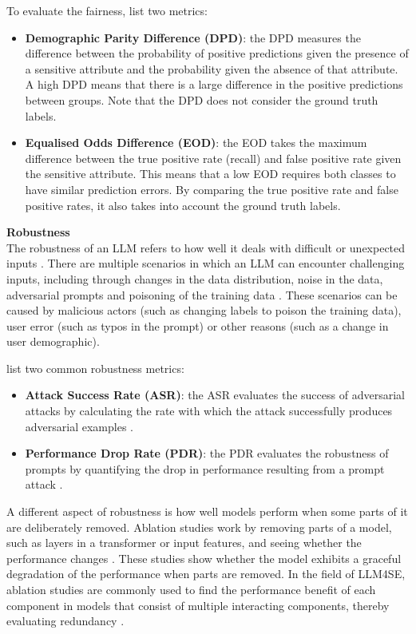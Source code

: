 \documentclass[a4paper]{article}
\begin{document}
To evaluate the fairness, \textcite{wang2024decodingtrust} list two metrics:
\begin{itemize}
	\item \textbf{Demographic Parity Difference (DPD)}: the DPD measures the difference between the probability of positive predictions given the presence of a sensitive attribute and the probability given the absence of that attribute. A high DPD means that there is a large difference in the positive predictions between groups. Note that the DPD does not consider the ground truth labels.
	\item \textbf{Equalised Odds Difference (EOD)}: the EOD takes the maximum difference between the true positive rate (recall) and false positive rate given the sensitive attribute. This means that a low EOD requires both classes to have similar prediction errors. By comparing the true positive rate and false positive rates, it also takes into account the ground truth labels. 
\end{itemize}

\textbf{Robustness}\\
The robustness of an LLM refers to how well it deals with difficult or unexpected inputs \cite{chang2023}. There are multiple scenarios in which an LLM can encounter challenging inputs, including through changes in the data distribution, noise in the data, adversarial prompts and poisoning of the training data \cite{liu2024,chang2023}. These scenarios can be caused by malicious actors (such as changing labels to poison the training data), user error (such as typos in the prompt) or other reasons (such as a change in user demographic). 

\textcite{chang2023} list two common robustness metrics:
\begin{itemize}
	\item \textbf{Attack Success Rate (ASR)}: the ASR evaluates the success of adversarial attacks by calculating the rate with which the attack successfully produces adversarial examples \cite{liu2024attacksuccesrate}. 
	\item \textbf{Performance Drop Rate (PDR)}: the PDR evaluates the robustness of prompts by quantifying the drop in performance resulting from a prompt attack \cite{zhu2024}. 
\end{itemize}

A different aspect of robustness is how well models perform when some parts of it are deliberately removed. Ablation studies work by removing parts of a model, such as layers in a transformer or input features, and seeing whether the performance changes \cite{meyes2019ablation}. These studies show whether the model exhibits a graceful degradation of the performance when parts are removed. In the field of LLM4SE, ablation studies are commonly used to find the performance benefit of each component in models that consist of multiple interacting components, thereby evaluating redundancy \cite{10586831,10402095}. 
\end{document}
